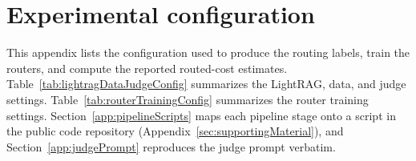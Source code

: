 \documentclass[english, bibtex]{kththesis}               %
\numberwithin{listing}{chapter}
\begin{document}
\cleardoublepage

\chapter{Experimental configuration}
\label{app:experimentalConfig}

This appendix lists the configuration used to produce the routing labels, train the routers, and compute the reported routed-cost estimates. Table~\ref{tab:lightragDataJudgeConfig} summarizes the LightRAG, data, and judge settings. Table~\ref{tab:routerTrainingConfig} summarizes the router training settings. Section~\ref{app:pipelineScripts} maps each pipeline stage onto a script in the public code repository (Appendix~\ref{sec:supportingMaterial}), and Section~\ref{app:judgePrompt} reproduces the judge prompt verbatim.
\end{document}

